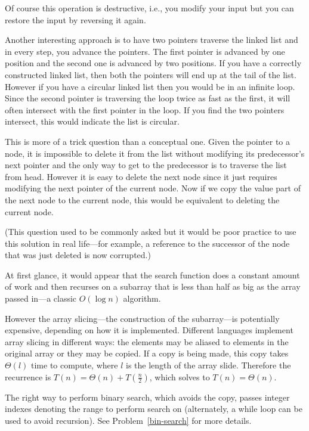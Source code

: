 Of course this operation is destructive,
i.e., you modify your input but you can restore the input by
reversing it again.

Another interesting approach is to have two pointers traverse the linked
list and in every step, you advance the pointers. The first pointer is
advanced by one position and the second one is advanced by two
positions. If you have a correctly constructed linked list, then both
the pointers will end up at the tail of the list. However if you have
a circular linked list then you would be in an infinite loop.
Since the second pointer is traversing the loop twice as fast as the
first, it will often intersect with the first pointer in the loop. If
you find the two pointers intersect, this would indicate the list is circular.

This is more of a trick question than a conceptual one. Given the pointer to a node, it is
impossible to delete it from the list without modifying its predecessor's
next pointer and the only way to get to the predecessor is to
traverse the list from head. However it is easy to delete the
next node since it just requires modifying the next pointer of the current
node. Now if we copy the value part of the next node to the current node,
this would be equivalent to deleting the current node. 

(This question used to be commonly asked but it would be poor practice
to use this solution in real life---for example, a reference 
to the successor of the node that was just deleted is now corrupted.)


At first glance, it would appear that the search function
does a constant amount of work and then recurses on a subarray
that is less than half as big as the array passed in---a
classic  $O(\log n)$ algorithm.

However the array slicing---the construction of the subarray---is potentially
expensive, depending on how it is implemented. 
Different languages implement array slicing in different ways: the elements may
be aliased to elements in the original array or they may be copied.
If a copy is being made, this copy takes $\Theta(l)$
time to compute, where $l$ is the length of the array slide. 
Therefore the recurrence is $T(n) = \Theta(n) + T(\frac{n}{2})$,
which solves to $T(n) = \Theta(n)$.  

The right way to perform binary search,
which avoids the copy, passes integer indexes denoting the range
to perform search on (alternately, a while loop can be used to avoid
recursion).  See Problem~\ref{bin-search} for more details.
